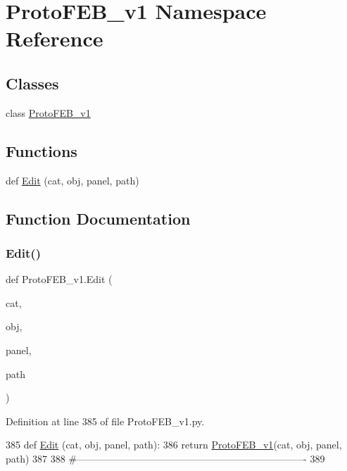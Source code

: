 \hypertarget{namespaceProtoFEB__v1}{}\section{Proto\+F\+E\+B\+\_\+v1 Namespace Reference}
\label{namespaceProtoFEB__v1}
\subsection*{Classes}
\begin{DoxyCompactItemize}
\item 
class \hyperlink{classProtoFEB__v1_1_1ProtoFEB__v1}{Proto\+F\+E\+B\+\_\+v1}
\end{DoxyCompactItemize}
\subsection*{Functions}
\begin{DoxyCompactItemize}
\item 
def \hyperlink{namespaceProtoFEB__v1_a618e4c6c0e9af700524a117b7e812a6a}{Edit} (cat, obj, panel, path)
\end{DoxyCompactItemize}


\subsection{Function Documentation}
\mbox{\label{namespaceProtoFEB__v1_a618e4c6c0e9af700524a117b7e812a6a}} 
\subsubsection{\texorpdfstring{Edit()}{Edit()}}
{\footnotesize\ttfamily def Proto\+F\+E\+B\+\_\+v1.\+Edit (\begin{DoxyParamCaption}\item[{}]{cat,  }\item[{}]{obj,  }\item[{}]{panel,  }\item[{}]{path }\end{DoxyParamCaption})}



Definition at line 385 of file Proto\+F\+E\+B\+\_\+v1.\+py.


\begin{DoxyCode}
385 \textcolor{keyword}{def }\hyperlink{namespaceProtoFEB__v1_a618e4c6c0e9af700524a117b7e812a6a}{Edit} (cat, obj, panel, path):
386     \textcolor{keywordflow}{return} \hyperlink{namespaceProtoFEB__v1}{ProtoFEB\_v1}(cat, obj, panel, path)
387 
388 \textcolor{comment}{#----------------------------------------------------------------------}
389 \end{DoxyCode}
